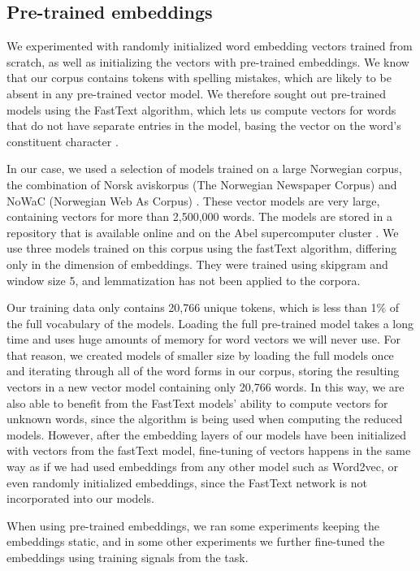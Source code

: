 \subsection{Pre-trained embeddings}

We experimented with randomly initialized word embedding vectors trained from
scratch, as well as initializing the vectors with pre-trained embeddings.
We know that our corpus contains tokens with spelling mistakes, which are
likely to be absent in any pre-trained vector model. We therefore sought out
pre-trained models using the FastText algorithm, which lets us compute
vectors for words that do not have separate entries in the model, basing
the vector on the word's constituent character \ngrams.

In our case, we used a selection of models trained on a large Norwegian
corpus, the combination of Norsk aviskorpus (The Norwegian Newspaper Corpus)
and NoWaC (Norwegian Web As Corpus) \autocite{stadsnes2018}. These vector
models are very large, containing vectors for more than 2,500,000 words. The
models are stored in a repository that is available online and on the Abel
supercomputer cluster \autocite{murhaf2017repository}. We use three models
trained on this corpus using the fastText algorithm, differing only in the
dimension of embeddings. They were trained using skipgram and window size 5, 
and lemmatization has not been applied to the corpora.

Our training data only contains 20,766 unique tokens, which is less than 1\%
of the full vocabulary of the models. Loading the full pre-trained model
takes a long time and uses huge amounts of memory for word vectors we will
never use. For that reason, we created models of smaller size by loading the
full models once and iterating through all of the word forms in our corpus,
storing the resulting vectors in a new vector model containing only 20,766
words. In this way, we are also able to benefit from the FastText models'
ability to compute vectors for unknown words, since the \ngram algorithm is
being used when computing the reduced models. However, after the embedding
layers of our models have been initialized with vectors from the fastText
model, fine-tuning of vectors happens in the same way as if we had used
embeddings from any other model such as Word2vec, or even randomly
initialized embeddings, since the FastText network is not incorporated into
our models.

When using pre-trained embeddings, we ran some experiments keeping the
embeddings static, and in some other experiments we further fine-tuned the
embeddings using training signals from the task.


